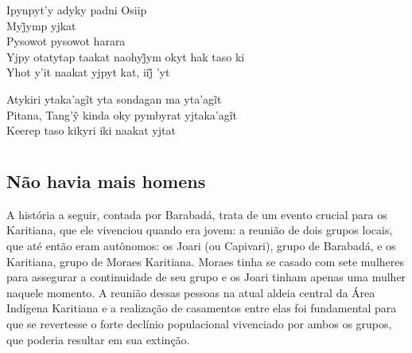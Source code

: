 \bigskip

\begin{linenumbers}\begingroup\raggedright
 
\noindent   Ipynpyt'y adyky padni Osiip\\
  Myj̃ymp yjkat\\
  Pysowot pysowot harara\\
  Yjpy otatytap taakat naohyj̃ym okyt hak taso ki\\
  Yhot y’it naakat yjpyt kat, iij̃ ’yt
 
\end{linenumbers}\endgroup

\bigskip

\begin{linenumbers}\begingroup\raggedright
 
\noindent   Atykiri ytaka’agĩt yta sondagan ma yta’agĩt\\
  Pitana, Tang’ỹ kinda oky pymbyrat yjtaka’agĩt\\
  Keerep taso kikyri iki naakat yjtat
\end{linenumbers}\endgroup

\chapter{}

\section{Não havia mais homens}

A história a seguir, contada por Barabadá, trata de um evento crucial para os Karitiana, que ele vivenciou quando era jovem: a reunião de dois grupos locais, que até então eram autônomos: os Joari (ou Capivari), grupo de Barabadá, e os Karitiana, grupo de Moraes Karitiana. Moraes tinha se casado com sete mulheres para assegurar a continuidade de seu grupo e os Joari tinham apenas uma mulher naquele momento. A reunião dessas pessoas na atual aldeia central da Área Indígena Karitiana e a realização de casamentos entre elas foi fundamental para que se revertesse o forte declínio populacional vivenciado por ambos os grupos, que poderia resultar em sua extinção.

